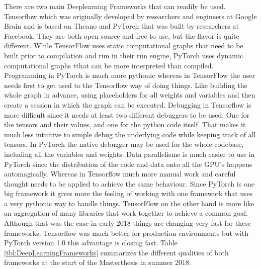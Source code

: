 There are two main Deeplearning Frameworks that can readily be used. Tensorflow which was originally developed by researchers and engineers at Google Brain and is based on Theano and PyTorch that was built by researchers at Facebook. They are both open source and free to use, but the flavor is quite different. While TensorFlow uses static computational graphs that need to be built prior to compilation and run in their run engine, PyTorch uses dynamic computational graphs tthat can be more interpreted than compiled. Programming in PyTorch is much more pythonic whereas in TensorFlow the user needs first to get used to the Tensorflow way of doing things. Like building the whole graph in advance, using placeholders for all weights and variables and then create a session in which the graph can be executed. Debugging in Tensorflow is more difficult since it needs at least two different debuggers to be used. One for the tensors and their values, and one for the python code itself. That makes it much less intuitive to simple debug the underlying code while keeping track of all tensors. In PyTorch the native debugger may be used for the whole codebase, including all the variables and weights. Data parallelisme is much easier to use in PyTorch since the distribution of the code and data onto all the GPU's happens automagically. Whereas in Tensorflow much more manual work and careful thought needs to be applied to achieve the same behaviour. Since PyTorch is one big framework it gives more the feeling of working with one framework that uses a very pythonic way to handle things. TensorFlow on the other hand is more like an aggregation of many libraries that work together to achieve a common goal. Although that was the case in early 2018 things are changing very fast for these frameworks. Tensorflow was much better for production environments but with PyTorch version 1.0 this advantage is closing fast. Table \ref{tbl:DeepLearningFrameworks} summarizes the different qualities of  both frameworks at the start of the Masterthesis in summer 2018.

